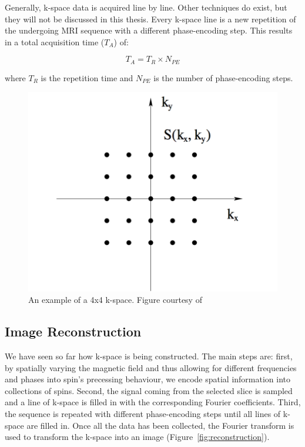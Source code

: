 Generally, k-space data is acquired line by line. Other techniques do exist, but they will not be discussed in this thesis. Every k-space line is a new repetition of the undergoing MRI sequence with a different phase-encoding step. This results in a total acquisition time ($T_A$) of:

\begin{equation}
    T_A = T_R \times N_{PE}
\end{equation}

where $T_R$ is the repetition time and $N_{PE}$ is the number of phase-encoding steps.

\begin{figure}[H]
    \centering
    \includegraphics[width=.8\textwidth,keepaspectratio]{kspace}
    \caption{An example of a 4x4 k-space. Figure courtesy of \cite{Drobnjak07}}
    \label{fig:kspace}
\end{figure}

\subsection{Image Reconstruction}
We have seen so far how k-space is being constructed. The main steps are: first, by spatially varying the magnetic field and thus allowing for different frequencies and phases into spin's precessing behaviour, we encode spatial information into collections of spins. Second, the signal coming from the selected slice is sampled and a line of k-space is filled in with the corresponding Fourier coefficients. Third, the sequence is repeated with different phase-encoding steps until all lines of k-space are filled in. Once all the data has been collected, the Fourier transform is used to transform the k-space into an image (Figure~\ref{fig:reconstruction}). 

